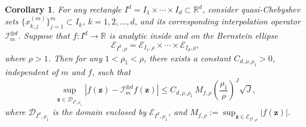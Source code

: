 \documentclass{article}
\numberwithin{equation}{section}
\newtheorem{corollary}{Corollary}
\def\RR{\mathbb{R}}
\begin{document}
\begin{corollary}
\label{cor:tensor-interp}
For any rectangle $I^d = I_1\times\cdots\times I_d \subset \RR^d$, consider quasi-Chebyshev sets $\{x_{k,j}^{(m)}\}_{j=1}^m\subset I_k$, $k=1,2,\ldots,d$, and its corresponding interpolation operator $\mathcal I_m^{\otimes d}$. Suppose that
\(f:I^d\to\RR\) is analytic inside and on the Bernstein ellipse
$$ \mathcal{E}_{I^d,\rho} = \mathcal{E}_{I_1,\rho} \times \cdots \times \mathcal{E}_{I_d,\rho},$$
where $\rho>1$. Then for any $1<\rho_1<\rho$, 
there exists a constant \(C_{d,\rho,\rho_1}>0\), independent of
\(m\) and \(f\), such that
\[
\sup_{\bm z\in\overline{\mathcal{D}_{I^d,\rho_1}}}
\left|
f(\bm z)-\mathcal{I}_m^{\otimes d}f(\bm z)
\right|
\le
C_{d,\rho,\rho_1}\,
M_{f,\rho}
\left(\frac{\rho_1}{\rho}\right)^J\sqrt{J},
\]
where $\mathcal{D}_{I^d,\rho_1}$ is the domain enclosed by $\mathcal{E}_{I^d,\rho_1}$, and
$
M_{f,\rho}
:=
\sup_{\bm z\in\mathcal{E}_{I^d,\rho}}|f(\bm z)|.
$
\end{corollary}
\end{document}
